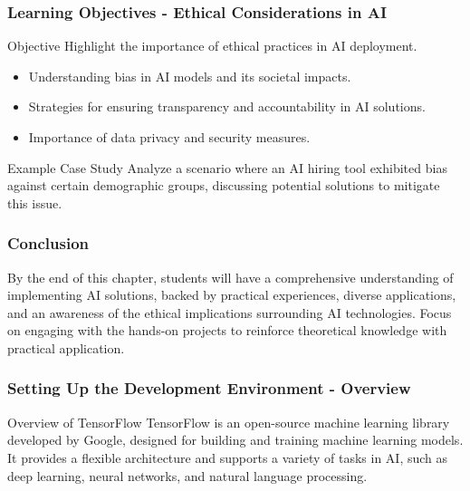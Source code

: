 \documentclass[aspectratio=169]{beamer}
\begin{document}
\begin{frame}[fragile]
    \frametitle{Learning Objectives - Ethical Considerations in AI}
    \begin{block}{Objective}
        Highlight the importance of ethical practices in AI deployment.
    \end{block}
    
    \begin{itemize}
        \item Understanding bias in AI models and its societal impacts.
        \item Strategies for ensuring transparency and accountability in AI solutions.
        \item Importance of data privacy and security measures.
    \end{itemize}
    
    \begin{block}{Example Case Study}
        Analyze a scenario where an AI hiring tool exhibited bias against certain demographic groups, discussing potential solutions to mitigate this issue.
    \end{block}
\end{frame}

\begin{frame}[fragile]
    \frametitle{Conclusion}
    By the end of this chapter, students will have a comprehensive understanding of implementing AI solutions, backed by practical experiences, diverse applications, and an awareness of the ethical implications surrounding AI technologies. Focus on engaging with the hands-on projects to reinforce theoretical knowledge with practical application.
\end{frame}

\begin{frame}[fragile]
    \frametitle{Setting Up the Development Environment - Overview}
    \begin{block}{Overview of TensorFlow}
        TensorFlow is an open-source machine learning library developed by Google, designed for building and training 
        machine learning models. It provides a flexible architecture and supports a variety of tasks in AI, 
        such as deep learning, neural networks, and natural language processing.
    \end{block}
\end{frame}
\end{document}
